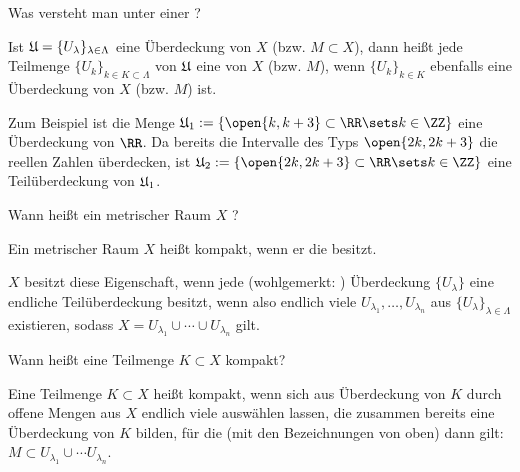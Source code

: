 \begin{frage}
  Was versteht man unter einer ?
\end{frage}

\begin{antwort}
  Ist $\frak{U}=\{ U_\lambda \}_{\lambda\in \Lambda}$ 
  eine Überdeckung von $X$ (bzw. $M\subset X$), dann heißt jede 
  Teilmenge $\{ U_{k} \}_{k \in K \subset \Lambda}$ 
  von $\frak{U}$ eine  von $X$ (bzw. $M$), 
  wenn $\{ U_k \}_{k \in K}$ ebenfalls eine Überdeckung 
  von $X$ (bzw. $M$) ist. 

  Zum Beispiel ist die Menge  
  $\frak{U}_1 := \{\open{ k,k+3 }\subset \RR \sets k\in \ZZ \}$ 
  eine Überdeckung von $\RR$.  
  Da bereits die Intervalle des Typs $\open{2k,2k+3}$ die reellen Zahlen 
  überdecken, ist $\frak{U}_2 := \{\open{2k,2k+3} \subset \RR \sets k\in \ZZ \}$ 
  eine Teilüberdeckung von $\frak{U}_1$. 
  \AntEnd 
\end{antwort}

\begin{frage}
  Wann heißt ein metrischer Raum $X$ ?
\end{frage}


\begin{antwort}
  
  Ein metrischer Raum $X$ heißt kompakt, wenn er die 
   besitzt. 

  $X$ besitzt diese Eigenschaft, wenn jede 
  (wohlgemerkt: )  Überdeckung 
  $\{ U_\lambda \}$ eine endliche Teilüberdeckung besitzt, wenn also 
  endlich viele $U_{\lambda_1}, 
  \ldots, U_{\lambda_n}$ aus $\{ U_\lambda \}_{\lambda\in \Lambda }$ 
  existieren, sodass 
  $X = U_{\lambda_1} \cup \cdots \cup U_{\lambda_n}$ gilt. \AntEnd 
\end{antwort}

\begin{frage}
  Wann heißt eine Teilmenge $K\subset X$ kompakt?
\end{frage}

\begin{antwort}
  Eine Teilmenge $K\subset X$ heißt kompakt, 
  wenn sich aus  Überdeckung von $K$ 
  durch offene Mengen aus $X$ endlich viele auswählen lassen, die 
  zusammen bereits eine Überdeckung von $K$ bilden, für die   
  (mit den Bezeichnungen von oben) dann gilt: 
  $M \subset U_{\lambda_1} \cup \cdots U_{\lambda_n}$. 
  \AntEnd
\end{antwort}

